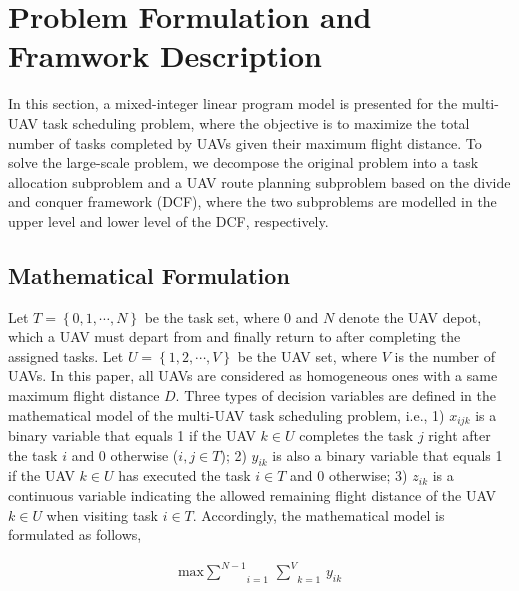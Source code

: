 \documentclass[lettersize,journal]{IEEEtran}
\begin{document}
	
	\section{Problem Formulation and Framwork Description}
	
	In this section, a mixed-integer linear program model is presented for the multi-UAV task scheduling problem, where the objective is to maximize the total number of tasks completed by UAVs given their maximum flight distance. To solve the large-scale problem, we decompose the original problem into a task allocation subproblem and a UAV route planning subproblem based on the divide and conquer framework (DCF), where the two subproblems are modelled in the upper level and lower level of the DCF, respectively.
	
	
	\subsection{Mathematical Formulation}
	
	Let $T=\left\{ 0,1,\cdots ,N \right\}$ be the task set, where 0 and $N$ denote the UAV depot, which a UAV must depart from and finally return to after completing the assigned tasks. Let $U=\left\{ 1,2,\cdots ,V \right\}$ be the UAV set, where $V$ is the number of UAVs. In this paper, all UAVs are considered as homogeneous ones with a same maximum flight distance $D$. Three types of decision variables are defined in the mathematical model of the multi-UAV task scheduling problem, i.e., 1) ${{x}_{ijk}}$ is a binary variable that equals 1 if the UAV $k \in U$ completes the task $j$ right after the task $i$ and 0 otherwise ($i,j \in T$); 2) ${{y}_{ik}}$ is also a binary variable that equals 1 if the UAV $k \in U$ has executed the task $i \in T$ and 0 otherwise; 3) ${{z}_{ik}}$ is a continuous variable indicating the allowed remaining flight distance of the UAV $k\in U$ when visiting task $i\in T$. Accordingly, the mathematical model is formulated as follows,
	
	\begin{small}
		\begin{equation}\label{objectivefunction}
			\begin{array}{cc}
				\text{max}\underset{i=1}{\overset{N-1}{\mathop \sum }}\,\underset{k=1}{\overset{V}{\mathop \sum }}\,{{y}_{ik}}
			\end{array}
		\end{equation}
	\end{small}
	
\end{document}
